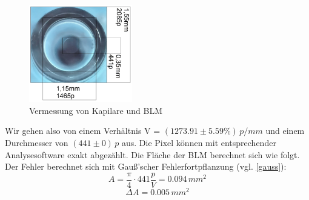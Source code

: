 \documentclass{include/thesisclass3}
\newcommand{\e}[1]{\,\si{#1}}
\begin{document}
\begin{figure}[ht]
	\begin{center}
		\includegraphics[width=0.4\textwidth]{images/Perle2.png}
		\caption{Vermessung von Kapilare und BLM}
		\label{Perle}
	\end{center}
\end{figure}
Wir gehen also von einem Verhältnis V = $(1273.91 \pm 5.59\%)\e{p/mm}$ und einem Durchmesser von $(441 \pm 0)\e{p}$ aus. Die Pixel können mit entsprechender Analysesoftware exakt abgezählt. Die Fläche der BLM berechnet sich wie folgt. Der Fehler berechnet sich mit Gau\ss'scher Fehlerfortpflanzung (vgl. \ref{gauss}):
\begin{equation}
A=\frac{\pi}{4}\cdot 441\frac{p}{V}=0.094\e{mm^2}
\end{equation}
\begin{equation}
\Delta A=0.005\e{mm^2}
\end{equation}
\end{document}
